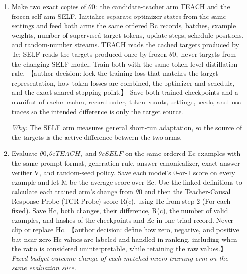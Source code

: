 \documentclass[10pt,a4paper]{article}
\begin{document}
\begin{enumerate}[leftmargin=*,start=3]
  \item Make two exact copies of \(\theta 0:\) the candidate-teacher arm TEACH and the frozen-self arm SELF. Initialize separate optimizer states from the same settings and feed both arms the same ordered Bc records, batches, example weights, number of supervised target tokens, update steps, schedule positions, and random-number streams. TEACH reads the cached targets produced by Tc;\allowbreak{} SELF reads the targets produced once by frozen \(\theta 0,\) never targets from the changing SELF model. Train both with the same token-level distillation rule. 【author decision: lock the training loss that matches the target representation, how token losses are combined, the optimizer and schedule, and the exact shared stopping point.】 Save both trained checkpoints and a manifest of cache hashes, record order, token counts, settings, seeds, and loss traces so the intended difference is only the target source.
\par\emph{Why:} The SELF arm measures general short-run adaptation, so the source of the targets is the active difference between the two arms.
  \item Evaluate \(\theta 0, \theta cTEACH,\) and \(\theta cSELF\) on the same ordered Ec examples with the same prompt format, generation rule, answer canonicalizer, exact-answer verifier V, and random-seed policy. Save each model's 0-or-1 score on every example and let M be the average score over Ec. Use the linked definitions to calculate each trained arm's change from \(\theta 0\) and then the Teacher-Causal Response Probe (TCR-Probe) score R(c), using Hc from step 2 (For each fixed). Save Hc, both changes, their difference, R(c), the number of valid examples, and hashes of the checkpoints and Ec in one triad record. Never clip or replace Hc. 【author decision: define how zero, negative, and positive but near-zero Hc values are labeled and handled in ranking, including when the ratio is considered uninterpretable, while retaining the raw values.】
\noindent\emph{Fixed-budget outcome change of each matched micro-training arm on the same evaluation slice.}
\par{}

\end{enumerate}
\end{document}
